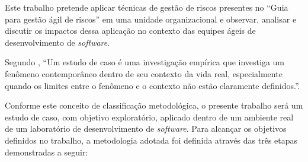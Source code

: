 \documentclass[
    12pt,       %
    openright,      %
    twoside,      %
    a4paper,      %
    english,      %
    french,       %
    spanish,      %
    brazil,       %
    ]{abntex2}
\begin{document}
Este trabalho pretende aplicar técnicas de gestão de riscos presentes no “Guia para gestão ágil de riscos”  \cite{Vieira:2020} em uma unidade organizacional e observar, analisar e discutir os impactos dessa aplicação no contexto das equipes ágeis de desenvolvimento de \textit{software}.

Segundo , “Um estudo de caso é uma investigação empírica que investiga um fenômeno contemporâneo dentro de seu contexto da vida real, especialmente quando os limites entre o fenômeno e o contexto não estão claramente
definidos.”. 

Conforme este conceito de classificação metodológica, o presente trabalho será um estudo de caso, com objetivo exploratório, aplicado dentro de um ambiente real de um laboratório de desenvolvimento de \textit{software}. Para alcançar os objetivos definidos no trabalho, a metodologia adotada foi definida através das três etapas demonstradas a seguir: 
\end{document}
